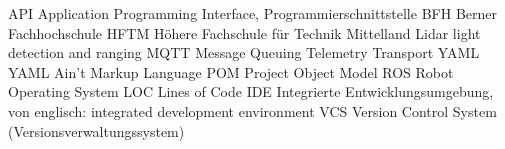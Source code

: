    {API}   {Application Programming Interface, Programmierschnittstelle}
   {BFH}   {Berner Fachhochschule}
  {HFTM}  {Höhere Fachschule für Technik Mittelland}
 {Lidar} {light detection and ranging}
  {MQTT}  {Message Queuing Telemetry Transport}
  {YAML}  {YAML Ain’t Markup Language}
   {POM}   {Project Object Model}
   {ROS}   {Robot Operating System}
   {LOC}   {Lines of Code}
   {IDE}   {Integrierte Entwicklungsumgebung, von englisch: integrated development environment}
   {VCS}   {Version Control System (Versionsverwaltungssystem)}

